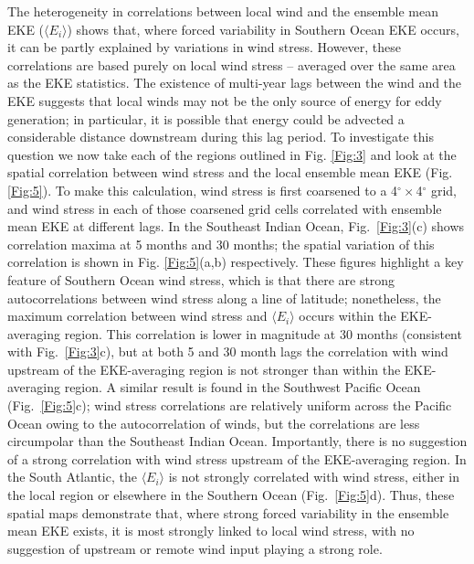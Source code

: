 \documentclass[linenumbers]{agujournal2019}
\begin{document}
The heterogeneity in correlations between local wind and the ensemble mean EKE ($\langle E_i \rangle$) shows that, where forced variability in Southern Ocean EKE occurs, it can be partly explained by variations in wind stress.
However, these correlations are based purely on local wind stress -- averaged over the same area as the EKE statistics.
The existence of multi-year lags between the wind and the EKE suggests that local winds may not be the only source of energy for eddy generation; in particular, it is possible that energy could be advected a considerable distance downstream during this lag period.
To investigate this question we now take each of the regions outlined in Fig. \ref{Fig:3} and look at the spatial correlation between wind stress and the local ensemble mean EKE (Fig. \ref{Fig:5}).
To make this calculation, wind stress is first coarsened to a 4$^\circ \times $4$^\circ$ grid, and wind stress in each of those coarsened grid cells correlated with ensemble mean EKE at different lags.
In the Southeast Indian Ocean, Fig.~\ref{Fig:3}(c) shows correlation maxima at 5 months and 30 months; the spatial variation of this correlation is shown in Fig. \ref{Fig:5}(a,b) respectively.
These figures highlight a key feature of Southern Ocean wind stress, which is that there are strong autocorrelations between wind stress along a line of latitude; nonetheless, the maximum correlation between wind stress and $\langle E_i \rangle$ occurs within the EKE-averaging region.
This correlation is lower in magnitude at 30 months (consistent with Fig.~\ref{Fig:3}c), but at both 5 and 30 month lags the correlation with wind upstream of the EKE-averaging region is not stronger than within the EKE-averaging region.
A similar result is found in the Southwest Pacific Ocean (Fig.~\ref{Fig:5}c); wind stress correlations are relatively uniform across the Pacific Ocean owing to the autocorrelation of winds, but the correlations are less circumpolar than the Southeast Indian Ocean.
Importantly, there is no suggestion of a strong correlation with wind stress upstream of the EKE-averaging region.
In the South Atlantic, the $\langle E_i \rangle$ is not strongly correlated with wind stress, either in the local region or elsewhere in the Southern Ocean (Fig.~\ref{Fig:5}d).
Thus, these spatial maps demonstrate that, where strong forced variability in the ensemble mean EKE exists, it is most strongly linked to local wind stress, with no suggestion of upstream or remote wind input playing a strong role. 
\end{document}
